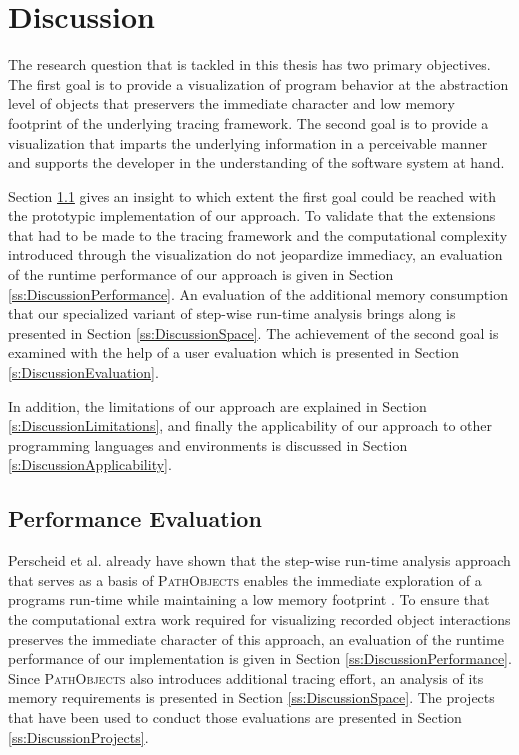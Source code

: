 \chapter{Discussion}
\label{c:discussion}
The research question that is tackled in this thesis has two primary objectives.
The first goal is to provide a visualization of program behavior at the abstraction level of objects that preservers the immediate character and low memory footprint of the underlying tracing framework.
The second goal is to provide a visualization that imparts the underlying information in a perceivable manner and supports the developer in the understanding of the software system at hand.

Section \ref{s:DiscussionPerformance} gives an insight to which extent the first goal could be reached with the prototypic implementation of our approach.
To validate that the extensions that had to be made to the tracing framework and the computational complexity introduced through the visualization do not jeopardize immediacy, an evaluation of the runtime performance of our approach is given in Section \ref{ss:DiscussionPerformance}.
An evaluation of the additional memory consumption that our specialized variant of  step-wise run-time analysis brings along is presented in Section \ref{ss:DiscussionSpace}. 
The achievement of the second goal is examined with the help of a user evaluation which is presented in Section \ref{s:DiscussionEvaluation}.

In addition, the limitations of our approach are explained in Section \ref{s:DiscussionLimitations}, and finally the applicability of our approach to other programming languages and environments is discussed in Section \ref{s:DiscussionApplicability}.

\section{Performance Evaluation}
\label{s:DiscussionPerformance}
Perscheid et al. already have shown that the step-wise run-time analysis approach that serves as a basis of \textsc{PathObjects} enables the immediate exploration of a programs run-time while maintaining a low memory footprint  \cite{perscheid_immediacy_2010}.
To ensure that the computational extra work required for visualizing recorded object interactions preserves the immediate character of this approach, an evaluation of the runtime performance of our implementation is given in Section \ref{ss:DiscussionPerformance}.
Since \textsc{PathObjects} also introduces additional tracing effort, an analysis of its memory requirements is presented in Section \ref{ss:DiscussionSpace}.
The projects that have been used to conduct those evaluations are presented in Section \ref{ss:DiscussionProjects}.

